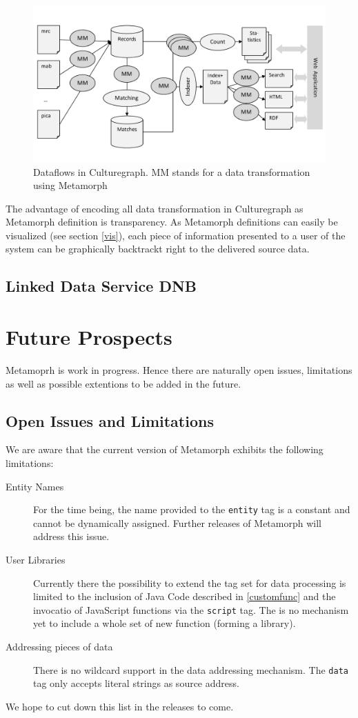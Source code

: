 \documentclass[12pt,a4paper]{article}
\begin{document}
\begin{figure}[htp]
\centering
\includegraphics[width=.96\textwidth]{figures/flow}
\caption{Dataflows in Culturegraph. MM stands for a data transformation using Metamorph}\label{fig:flow}
\end{figure}

The advantage of encoding all data transformation in Culturegraph as Metamorph definition is transparency. As Metamorph definitions can easily be visualized (see section \ref{vis}), each piece of information presented to a user of the system can be graphically backtrackt right to the delivered source data.


\subsection{Linked Data Service DNB}



\section{Future Prospects}
Metamoprh is work in progress. Hence there are naturally open issues, limitations as well as possible extentions to be added in the future. 

\subsection{Open Issues and Limitations}

We are aware that the current version of Metamorph exhibits the following limitations:

\begin{description}
\item[Entity Names]  For the time being, the name provided to the {\tt entity} tag is a constant and cannot be dynamically assigned. Further releases of Metamorph will address this issue.
\item[User Libraries] Currently there the possibility to extend the tag set for data processing is limited to the inclusion of Java Code described in \ref{customfunc} and the invocatio of JavaScript functions via the {\tt script} tag. The is no mechanism yet to include a whole set of new function (forming a library).
\item[Addressing pieces of data] There is no wildcard support in the data addressing mechanism. The {\tt data} tag only accepts literal strings as source address.
\end{description}
We hope to cut down this list in the releases to come.
\end{document}
